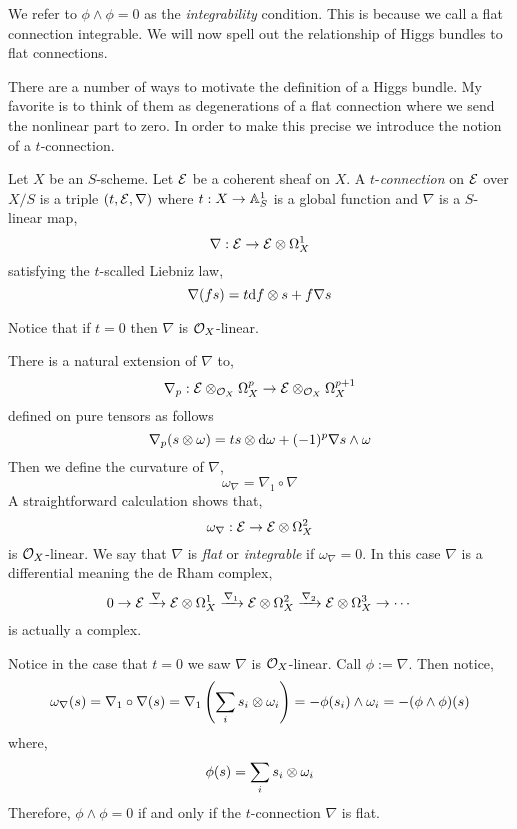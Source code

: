 \documentclass[12pt]{article}
\begin{document}
\begin{rmk}
We refer to $\phi \wedge \phi = 0$ as the \textit{integrability} condition. This is because we call a flat connection integrable. We will now spell out the relationship of Higgs bundles to flat connections. 
\end{rmk}

There are a number of ways to motivate the definition of a Higgs bundle. My favorite is to think of them as degenerations of a flat connection where we send the nonlinear part to zero. In order to make this precise we introduce the notion of a $t$-connection.

\begin{defn}
Let $X$ be an $S$-scheme. Let $\mathcal{E}$ be a coherent sheaf on $X$. A $t$-\textit{connection} on $\mathcal{E}$ over $X/S$ is a triple $(t, \mathcal{E}, \nabla)$ where $t : X \to \mathbb{A}^1_S$ is a global function and $\nabla$ is a $S$-linear map,
\[ \nabla : \mathcal{E} \to \mathcal{E} \otimes \Omega^1_X \]
satisfying the $t$-scalled Liebniz law,
\[ \nabla(f s) = t \mathrm{d}{f} \otimes s + f \nabla s \] 
\end{defn}

\begin{rmk}
Notice that if $t = 0$ then $\nabla$ is $\mathcal{O}_{X}$-linear.
\end{rmk}

\begin{defn}
There is a natural extension of $\nabla$ to,
\[ \nabla_p : \mathcal{E} \otimes_{\mathcal{O}_{X}} \Omega^p_X \to \mathcal{E} \otimes_{\mathcal{O}_{X}} \Omega^{p+1}_X \]
defined on pure tensors as follows
\[ \nabla_p(s \otimes \omega) = t s \otimes \mathrm{d}{\omega} + (-1)^p \nabla s \wedge \omega \]
Then we define the curvature of $\nabla$,
\[ \omega_{\nabla} = \nabla_1 \circ \nabla \]
A straightforward calculation shows that,
\[ \omega_{\nabla} : \mathcal{E} \to \mathcal{E} \otimes \Omega^2_X \]
is $\mathcal{O}_{X}$-linear. We say that $\nabla$ is \textit{flat} or \textit{integrable} if $\omega_{\nabla} = 0$. In this case $\nabla$ is a differential meaning the de Rham complex,
\[ 0 \to \mathcal{E} \xrightarrow{\nabla} \mathcal{E} \otimes \Omega^1_X \xrightarrow{\nabla_1} \mathcal{E} \otimes \Omega_X^2 \xrightarrow{\nabla_2} \mathcal{E} \otimes \Omega_X^3 \to \cdots \]
is actually a complex.
\end{defn}

\begin{rmk}
Notice in the case that $t = 0$ we saw $\nabla$ is $\mathcal{O}_{X}$-linear. Call $\phi := \nabla$. Then notice,
\[ \omega_{\nabla}(s) = \nabla_1 \circ \nabla(s) = \nabla_1 \left( \sum_i s_i \otimes \omega_i \right) = - \phi(s_i) \wedge \omega_i = - (\phi \wedge \phi)(s) \] 
where,
\[ \phi(s) = \sum_i s_i \otimes \omega_i \]
Therefore, $\phi \wedge \phi = 0$ if and only if the $t$-connection $\nabla$ is flat. 
\end{rmk}
\end{document}
